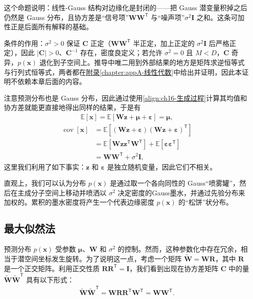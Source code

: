 \documentclass[../../main.tex]{subfiles}
\begin{document}
\begin{remark}
这个命题说明：线性-Gauss 结构对边缘化是封闭的——把 Gauss 潜变量积掉之后仍然是 Gauss 分布，且协方差是“信号项”$\bm{W}\bm{W}^{\mathsf T}$ 与“噪声项”$\sigma^2\bm{I}$ 之和。这条可加性正是后面所有解释的基础。

条件的作用：$\sigma^2>0$ 保证 $\bm{C}$ 正定（$\bm{W}\bm{W}^{\mathsf T}$ 半正定，加上正定的 $\sigma^2\bm{I}$ 后严格正定），因此 $|\bm{C}|>0$、$\bm{C}^{-1}$ 存在，密度良定义；若允许 $\sigma^2=0$ 且 $M<D$，$\bm{C}$ 奇异，$p(\bm{x})$ 退化到子空间上。推导中唯二用到外部结果的地方是矩阵求逆恒等式与行列式恒等式，两者都在\hyperref[chapter:appA-线性代数]{附录\ref*{chapter:appA-线性代数}}中给出并证明，因此本证明不依赖本章后面的内容。
\end{remark}

注意预测分布也是 Gauss 分布，因此通过使用\eqref{align:ch16-生成过程}计算其均值和协方差就能更直接地得出同样的结果，于是有
\begin{align}
  \mathbb{E}[\bm{x}]=\mathbb{E}[\bm{W}\bm{z}+\bm{\mu}+\bm{\varepsilon}]=\bm{\mu},
  \label{align:ch16-边缘均值}
\end{align}
\begin{align}
  \operatorname{cov}[\bm{x}]&=\mathbb{E}\left[(\bm{W}\bm{z}+\bm{\varepsilon})(\bm{W}\bm{z}+\bm{\varepsilon})^{\mathsf T}\right]\nonumber\\
  &=\mathbb{E}\left[\bm{W}\bm{z}\bm{z}^{\mathsf T}\bm{W}^{\mathsf T}\right]+\mathbb{E}\left[\bm{\varepsilon}\bm{\varepsilon}^{\mathsf T}\right]\nonumber\\
  &=\bm{W}\bm{W}^{\mathsf T}+\sigma^2\bm{I},
  \label{align:ch16-边缘协方差推导}
\end{align}
这里我们利用了如下事实：$\bm{z}$ 和 $\bm{\varepsilon}$ 是独立随机变量，因此它们不相关。

直观上，我们可以认为分布 $p(\bm{x})$ 是通过取一个各向同性的 Gauss“喷雾罐”，然后在主成分子空间上移动并喷洒以 $\sigma^2$ 决定密度的Gauss墨水，并通过先验分布来加权的。累积的墨水密度将产生一个代表边缘密度 $p(\bm{x})$ 的“松饼”状分布。

\subsection{最大似然法}\label{subsection:ch16-最大似然法}

预测分布 $p(\bm{x})$ 受参数 $\bm{\mu}$、$\bm{W}$ 和 $\sigma^2$ 的控制。然而，这种参数化中存在冗余，相当于潜空间坐标发生旋转。为了说明这一点，考虑一个矩阵 $\widetilde{\bm{W}}=\bm{W}\bm{R}$，其中 $\bm{R}$ 是一个正交矩阵。利用正交性质 $\bm{R}\bm{R}^{\mathsf T}=\bm{I}$，我们看到出现在协方差矩阵 $\bm{C}$ 中的量 $\widetilde{\bm{W}}\widetilde{\bm{W}}^{\mathsf T}$ 具有以下形式：
\begin{align}
  \widetilde{\bm{W}}\widetilde{\bm{W}}^{\mathsf T}=\bm{W}\bm{R}\bm{R}^{\mathsf T}\bm{W}^{\mathsf T}=\bm{W}\bm{W}^{\mathsf T}.
  \label{align:ch16-旋转不变}
\end{align}
\end{document}
